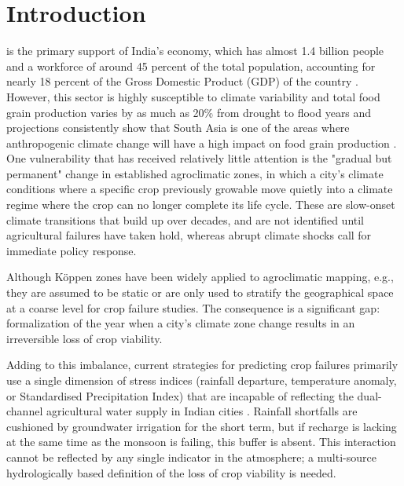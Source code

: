 \documentclass{ieeeaccess}
\begin{document}
\titlepgskip=-15pt

\maketitle

\section{Introduction}
\label{sec:introduction}

 is the primary support of India's economy, which has almost 1.4 billion people and a workforce of around 45 percent of the total population, accounting for nearly 18 percent of the Gross Domestic Product (GDP) of the country \cite{fao2023}. However, this sector is highly susceptible to climate variability and total food grain production varies by as much as 20\% from drought to flood years and projections consistently show that South Asia is one of the areas where anthropogenic climate change will have a high impact on food grain production \cite{ipccar6wg2}. One vulnerability that has received relatively little attention is the "gradual but permanent" change in established agroclimatic zones, in which a city's climate conditions where a specific crop previously growable move quietly into a climate regime where the crop can no longer complete its life cycle. These are slow-onset climate transitions that build up over decades, and are not identified until agricultural failures have taken hold, whereas abrupt climate shocks call for immediate policy response.

Although K\"{o}ppen zones have been widely applied to agroclimatic mapping, e.g., \cite{beck2018} they are assumed to be static or are only used to stratify the geographical space at a coarse level for crop failure studies. The consequence is a significant gap: formalization of the year when a city's climate zone change results in an irreversible loss of crop viability.

Adding to this imbalance, current strategies for predicting crop failures primarily use a single dimension of stress indices (rainfall departure, temperature anomaly, or Standardised Precipitation Index) that are incapable of reflecting the dual-channel agricultural water supply in Indian cities \cite{lobell2007}. Rainfall shortfalls are cushioned by groundwater irrigation for the short term, but if recharge is lacking at the same time as the monsoon is failing, this buffer is absent. This interaction cannot be reflected by any single indicator in the atmosphere; a multi-source hydrologically based definition of the loss of crop viability is needed.
\end{document}
